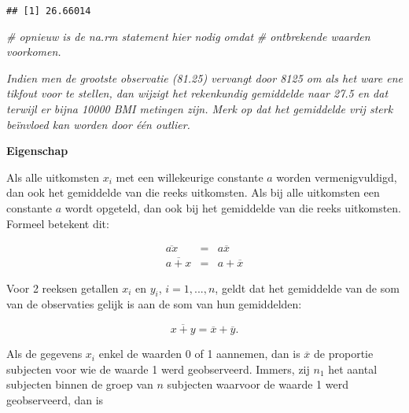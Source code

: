 \documentclass[
  12pt,dutch,coursenotes]{book}
\newenvironment{Shaded}{\begin{snugshade}}{\end{snugshade}}
\newcommand{\CommentTok}[1]{\textcolor[rgb]{0.56,0.35,0.01}{\textit{#1}}}
\newcommand{\DataTypeTok}[1]{\textcolor[rgb]{0.13,0.29,0.53}{#1}}
\newcommand{\KeywordTok}[1]{\textcolor[rgb]{0.13,0.29,0.53}{\textbf{#1}}}
\newcommand{\NormalTok}[1]{#1}
\newcommand{\OperatorTok}[1]{\textcolor[rgb]{0.81,0.36,0.00}{\textbf{#1}}}
\newcommand{\OtherTok}[1]{\textcolor[rgb]{0.56,0.35,0.01}{#1}}
\theoremstyle{definition}
\theoremstyle{definition}
\theoremstyle{definition}
\theoremstyle{remark}
\begin{document}
\begin{Shaded}
\end{Shaded}

\begin{verbatim}
## [1] 26.66014
\end{verbatim}

\begin{Shaded}
\begin{Highlighting}[]
\CommentTok{\# opnieuw is de na.rm statement hier nodig omdat}
\CommentTok{\# ontbrekende waarden voorkomen.}
\end{Highlighting}
\end{Shaded}

\emph{Indien men de grootste observatie (81.25) vervangt door 8125 om als het ware ene tikfout voor te stellen, dan wijzigt het rekenkundig gemiddelde naar 27.5 en dat terwijl er bijna 10000 BMI metingen zijn. Merk op dat het gemiddelde vrij sterk beïnvloed kan worden door één outlier.}

\textbf{Eigenschap}

Als alle uitkomsten \(x_i\) met een willekeurige constante \(a\)
worden vermenigvuldigd, dan ook het gemiddelde van die reeks uitkomsten. Als
bij alle uitkomsten een constante \(a\) wordt opgeteld, dan ook bij het
gemiddelde van die reeks uitkomsten. Formeel betekent dit:

\begin{eqnarray*}
\overline{ax} &= &a \overline{x} \\
\overline{a + x} &= &a + \overline{x}
\end{eqnarray*}

Voor 2 reeksen getallen \(x_i\) en \(y_i\), \(i=1,...,n\), geldt dat het
gemiddelde van de som van de observaties gelijk is aan de som van hun
gemiddelden:

\begin{equation*}
\overline{x + y} = \overline{x} + \overline{y}.
\end{equation*}

Als de gegevens \(x_i\) enkel de waarden 0 of 1 aannemen, dan is \(\overline{x}\)
de proportie subjecten voor wie de waarde 1 werd geobserveerd. Immers, zij \(n_1\) het aantal subjecten binnen de groep van \(n\) subjecten waarvoor de
waarde 1 werd geobserveerd, dan is
\end{document}
